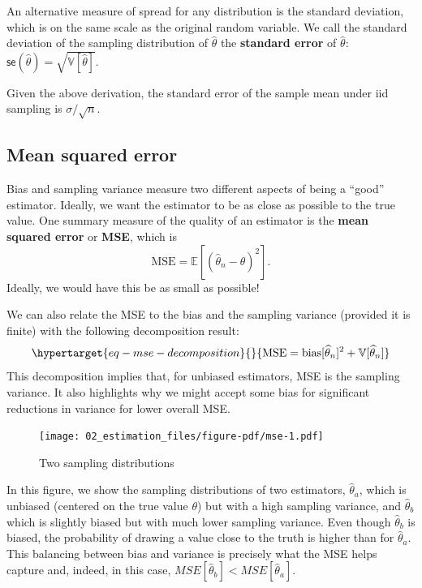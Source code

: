 \documentclass[
  letterpaper,
  DIV=11,
  numbers=noendperiod]{scrreprt}
\newcommand{\E}{\mathbb{E}}
\newcommand{\V}{\mathbb{V}}
\newcommand{\se}{\textsf{se}}
\theoremstyle{definition}
\theoremstyle{plain}
\theoremstyle{definition}
\theoremstyle{remark}
\begin{document}
An alternative measure of spread for any distribution is the standard
deviation, which is on the same scale as the original random variable.
We call the standard deviation of the sampling distribution of
\(\widehat{\theta}\) the \textbf{standard error} of
\(\widehat{\theta}\):
\(\se(\widehat{\theta}) = \sqrt{\V[\widehat{\theta}]}\).

Given the above derivation, the standard error of the sample mean under
iid sampling is \(\sigma / \sqrt{n}\).

\hypertarget{mean-squared-error}{%
\subsection{Mean squared error}\label{mean-squared-error}}

Bias and sampling variance measure two different aspects of being a
``good'' estimator. Ideally, we want the estimator to be as close as
possible to the true value. One summary measure of the quality of an
estimator is the \textbf{mean squared error} or \textbf{MSE}, which is\\
\[
\text{MSE} = \E[(\widehat{\theta}_n-\theta)^2].
\] Ideally, we would have this be as small as possible!

We can also relate the MSE to the bias and the sampling variance
(provided it is finite) with the following decomposition result:
\begin{equation}\protect\hypertarget{eq-mse-decomposition}{}{
\text{MSE} = \text{bias}[\widehat{\theta}_n]^2 + \V[\widehat{\theta}_n]
}\label{eq-mse-decomposition}\end{equation} This decomposition implies
that, for unbiased estimators, MSE is the sampling variance. It also
highlights why we might accept some bias for significant reductions in
variance for lower overall MSE.

\begin{figure}

{\centering \texttt{[image: 02\_estimation\_files/figure-pdf/mse-1.pdf]}

}

\caption{Two sampling distributions}

\end{figure}

In this figure, we show the sampling distributions of two estimators,
\(\widehat{\theta}_a\), which is unbiased (centered on the true value
\(\theta\)) but with a high sampling variance, and
\(\widehat{\theta}_b\) which is slightly biased but with much lower
sampling variance. Even though \(\widehat{\theta}_b\) is biased, the
probability of drawing a value close to the truth is higher than for
\(\widehat{\theta}_a\). This balancing between bias and variance is
precisely what the MSE helps capture and, indeed, in this case,
\(MSE[\widehat{\theta}_b] < MSE[\widehat{\theta}_a]\).
\end{document}
